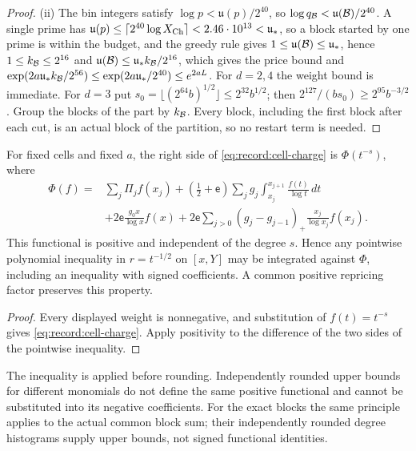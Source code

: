 \begin{proof}
(ii) The bin integers satisfy $\log p<\mathfrak u(p)/2^{40}$, so
$\log q_{\mathcal B}<\mathfrak u(\mathcal B)/2^{40}$. A single prime has
$\mathfrak u(p)\le\lceil2^{40}\log X_{\rm Ch}\rceil<2.46\cdot10^{13}<\mathfrak u_*$,
so a block started by one prime is within the budget, and the greedy rule
gives $1\le\mathfrak u(\mathcal B)\le\mathfrak u_*$, hence $1\le k_{\mathcal B}\le2^{16}$
and $\mathfrak u(\mathcal B)\le\mathfrak u_*k_{\mathcal B}/2^{16}$, which gives the price
bound and $\exp(2a\mathfrak u_*k_{\mathcal B}/2^{56})\le\exp(2a\mathfrak u_*/2^{40})
\le e^{2aL}$. For $d=2,4$ the weight bound is immediate. For $d=3$ put
$s_0=\lfloor(2^{64}b)^{1/2}\rfloor\le2^{32}b^{1/2}$; then
$2^{127}/(bs_0)\ge2^{95}b^{-3/2}$. Group the blocks of the part by $k_{\mathcal B}$.
Every block, including the first block after each cut, is an actual block
of the partition, so no restart term is needed.
\end{proof}

\begin{corollary}
\label{cor:positive-charge-functional}
For fixed cells and fixed $a$, the right side of
\eqref{eq:record:cell-charge} is $\Phi(t^{-s})$, where
\begin{align*}
 \Phi(f)={}&\sum_j\Pi_j f(x_j)
 +(\tfrac12+\mathsf e)\sum_jg_j\int_{x_j}^{x_{j+1}}
                                      \frac{f(t)}{\log t}\,dt\\
 &+2\mathsf e\frac{g_0x}{\log x}f(x)
 +2\mathsf e\sum_{j>0}(g_j-g_{j-1})_+
                              \frac{x_j}{\log x_j}f(x_j).
\end{align*}
This functional is positive and independent of the degree $s$.
Hence any pointwise polynomial inequality in $r=t^{-1/2}$ on
$[x,Y]$ may be integrated against $\Phi$, including an
inequality with signed coefficients. A common positive repricing
factor preserves this property.
\end{corollary}
\begin{proof}
Every displayed weight is nonnegative, and substitution of $f(t)=t^{-s}$
gives \eqref{eq:record:cell-charge}. Apply positivity to the difference
of the two sides of the pointwise inequality.
\end{proof}

The inequality is applied before rounding. Independently rounded
upper bounds for different monomials do not define the same positive
functional and cannot be substituted into its negative coefficients.
For the exact blocks the same principle applies to the actual common
block sum; their independently rounded degree histograms supply upper
bounds, not signed functional identities.


